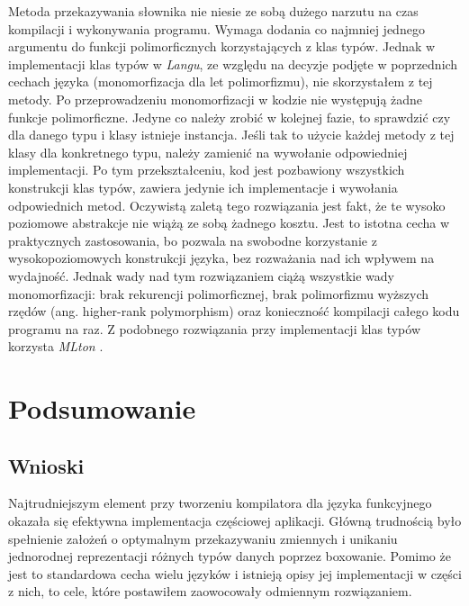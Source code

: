 \documentclass[declaration,shortabstract]{iithesis}
\begin{document}

Metoda przekazywania słownika nie niesie ze sobą dużego narzutu na czas 
kompilacji i wykonywania programu. Wymaga dodania co najmniej
jednego argumentu do funkcji polimorficznych korzystających z klas typów. 
Jednak w implementacji klas typów w \textit{Langu}, ze względu na decyzje 
podjęte w poprzednich cechach języka (monomorfizacja dla let polimorfizmu), 
nie skorzystałem z tej metody. Po przeprowadzeniu monomorfizacji w kodzie nie 
występują żadne funkcje polimorficzne. Jedyne co należy zrobić w kolejnej 
fazie, to sprawdzić czy dla danego typu i klasy istnieje instancja. Jeśli tak 
to użycie każdej metody z tej klasy dla konkretnego typu, należy zamienić 
na wywołanie odpowiedniej implementacji. Po tym przekształceniu, kod jest 
pozbawiony wszystkich konstrukcji klas typów, zawiera jedynie ich 
implementacje i wywołania odpowiednich metod. Oczywistą zaletą tego rozwiązania
jest fakt, że te wysoko poziomowe abstrakcje nie wiążą ze sobą żadnego kosztu.
Jest to istotna cecha w praktycznych zastosowania, bo pozwala na swobodne 
korzystanie z wysokopoziomowych konstrukcji języka, bez rozważania nad ich 
wpływem na wydajność. Jednak wady nad tym rozwiązaniem ciążą wszystkie wady 
monomorfizacji: brak rekurencji polimorficznej, brak polimorfizmu wyższych 
rzędów (ang. higher-rank polymorphism) oraz konieczność kompilacji całego kodu 
programu na raz. Z podobnego rozwiązania przy implementacji klas typów 
korzysta \textit{MLton} \cite{okmij}.



\chapter{Podsumowanie}

\section{Wnioski}
Najtrudniejszym element przy tworzeniu kompilatora dla języka funkcyjnego 
okazała się efektywna implementacja częściowej aplikacji. Główną trudnością
było spełnienie założeń o optymalnym przekazywaniu zmiennych i unikaniu 
jednorodnej reprezentacji różnych typów danych poprzez boxowanie. Pomimo że 
jest to standardowa cecha wielu języków i istnieją opisy jej implementacji
w części z nich, to cele, które postawiłem zaowocowały odmiennym rozwiązaniem.
\end{document}
